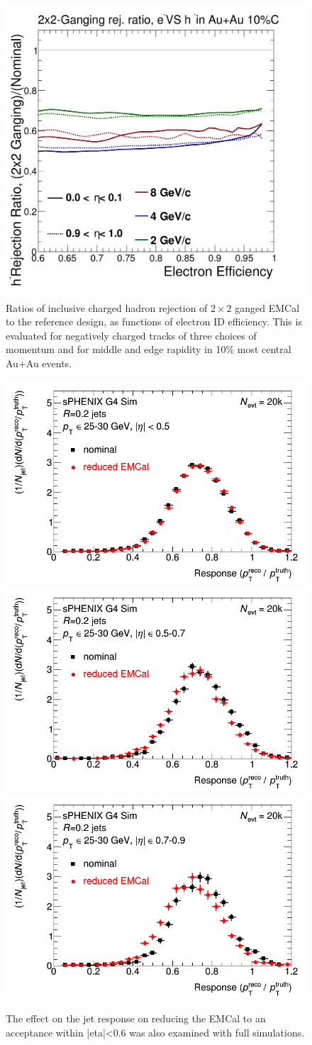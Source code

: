 \begin{figure}[hbt]
  \centering
  \includegraphics[width=0.6\linewidth]{figs/DrawEcal_Likelihood_Sum_RejectionCurve_AuAuSummary_Compare}
  \caption{ Ratios of inclusive charged hadron rejection of $2\times2$
    ganged EMCal to the reference design, as functions of electron ID
    efficiency. This is evaluated for negatively charged tracks of
    three choices of momentum and for middle and edge rapidity in 10\%
    most central Au+Au events.}
\label{fig:eid_ratios_auau}
\end{figure}

\begin{figure}[hbt]
  \centering
  \includegraphics[width=0.4\linewidth]{figs/jet_response_reduced_emcal_eta_0} \\
  \includegraphics[width=0.4\linewidth]{figs/jet_response_reduced_emcal_eta_05} \\
  \includegraphics[width=0.4\linewidth]{figs/jet_response_reduced_emcal_eta_07}
  \caption{The effect on the jet response on reducing the EMCal to an acceptance within |eta|<0.6 was also examined with full \geant simulations.}
  \label{fig:jet_response_reduced_emcal}
\end{figure}

